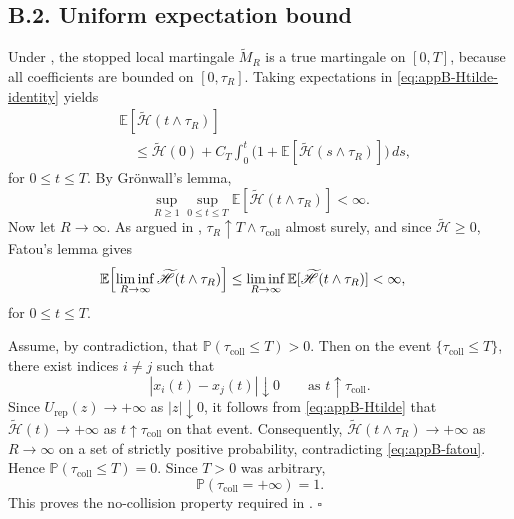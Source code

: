 \documentclass[pdflatex,sn-mathphys-num]{sn-jnl}%
\numberwithin{equation}{section}
\theoremstyle{thmstyleone}%
\theoremstyle{remark}
\theoremstyle{definition}
\newcommand{\E}{\mathbb{E}}
\newcommand{\Prob}{\mathbb{P}}
\begin{document}
\subsection*{B.2. Uniform expectation bound}
Under , the stopped local martingale
$\widetilde{M}_R$ is a true martingale on $[0,T]$, because all
coefficients are bounded on $[0,\tau_R]$. Taking expectations in
\eqref{eq:appB-Htilde-identity} yields
\begin{equation*}
\begin{aligned}
  &\E[\widetilde{\mathscr H}(t\wedge\tau_R)] \\
  &\quad \le
  \widetilde{\mathscr H}(0)
  + C_T\int_0^t
  \bigl(1+\E[\widetilde{\mathscr H}(s\wedge\tau_R)]\bigr)\,ds,
\end{aligned}
\end{equation*}
for $0\le t\le T$. By Gr\"onwall's lemma,
\begin{equation}\label{eq:appB-uniform}
  \sup_{R\ge 1}\sup_{0\le t\le T}
  \E[\widetilde{\mathscr H}(t\wedge\tau_R)]
  <\infty.
\end{equation}
Now let $R\to\infty$. As argued in ,
$\tau_R\uparrow T\wedge\tau_{\mathrm{coll}}$ almost surely, and since
$\widetilde{\mathscr H}\ge 0$, Fatou's lemma gives
\begin{equation}\label{eq:appB-fatou}
\begin{aligned}
  \E\Bigl[\liminf_{R\to\infty}\widetilde{\mathscr H}(t\wedge\tau_R)\Bigr]
  &\le
  \liminf_{R\to\infty}
  \E[\widetilde{\mathscr H}(t\wedge\tau_R)]
  <\infty,
\end{aligned}
\end{equation}
for $0\le t\le T$.

Assume, by contradiction, that $\Prob(\tau_{\mathrm{coll}}\le T)>0$. Then
on the event $\{\tau_{\mathrm{coll}}\le T\}$, there exist indices
$i\neq j$ such that
\[
  |x_i(t)-x_j(t)|\downarrow 0
  \qquad\text{as }t\uparrow\tau_{\mathrm{coll}}.
\]
Since $U_{\mathrm{rep}}(z)\to+\infty$ as $|z|\downarrow 0$, it follows
from \eqref{eq:appB-Htilde} that
$\widetilde{\mathscr H}(t)\to+\infty$ as
$t\uparrow\tau_{\mathrm{coll}}$ on that event. Consequently,
$\widetilde{\mathscr H}(t\wedge\tau_R)\to+\infty$ as $R\to\infty$ on a set
of strictly positive probability, contradicting \eqref{eq:appB-fatou}.
Hence $\Prob(\tau_{\mathrm{coll}}\le T)=0$. Since $T>0$ was arbitrary,
\begin{equation}\label{eq:appB-nocollision}
  \Prob(\tau_{\mathrm{coll}}=+\infty)=1.
\end{equation}
This proves the no-collision property required in .
\hfill$\square$
\end{document}
